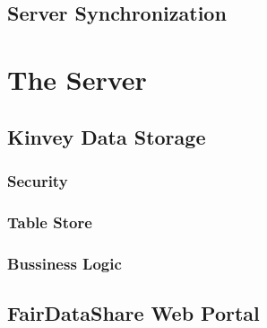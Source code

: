 \subsection{Server Synchronization}




\section{The Server}

\subsection{Kinvey Data Storage}

\subsubsection{Security}

\subsubsection{Table Store}

\subsubsection{Bussiness Logic}

\subsection{FairDataShare Web Portal}







